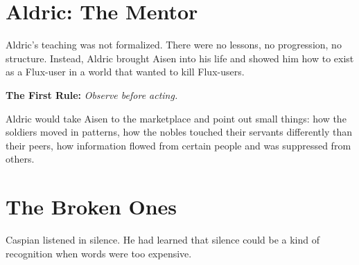 \documentclass{cwbook_minimal}
\begin{document}

\chapter{Aldric: The Mentor}

Aldric’s teaching was not formalized. There were no lessons, no progression, no structure.
Instead, Aldric brought Aisen into his life and showed him how to exist as a Flux-user in a
world that wanted to kill Flux-users.

\textbf{The First Rule:} \textit{Observe before acting.}

Aldric would take Aisen to the marketplace and point out small things: how the soldiers moved
in patterns, how the nobles touched their servants differently than their peers, how information
flowed from certain people and was suppressed from others.

\clearpage
{}

\chapter{The Broken Ones}

Caspian listened in silence. He had learned that silence could be a kind of recognition when
words were too expensive.
\end{document}
